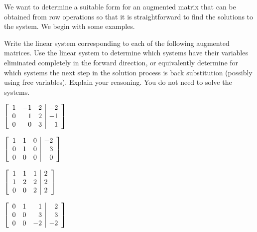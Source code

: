 \begin{pa} \label{pa:1_c}  We want to determine a suitable form for an augmented matrix that can be obtained from row operations so that it is straightforward to find the solutions to the system. We begin with some examples.

\be
\item Write the linear system corresponding to each of the following augmented matrices. Use the linear system to determine which systems have their variables eliminated completely in the forward direction, or equivalently determine for which systems the next step in the solution process is back substitution (possibly using free variables). Explain your reasoning. You do not need to solve the systems. 
	\begin{enumerate}[i.]
	\begin{minipage}{2.0in}
	\item $\displaystyle \left[ \begin{array}{rrc|r} 1 & -1 & 2 & -2 \\ 0 & 1 & 2& -1 \\ 0 & 0 & 3 & 1   \end{array} \right]$
	\end{minipage}
	\begin{minipage}{2.0in}
	\item $\displaystyle \left[ \begin{array}{crc|r} 1 & 1 & 0 & -2 \\ 0 & 1 & 0 & 3  \\ 0 & 0 & 0& 0 \end{array} \right]$
	\end{minipage}
	
	\begin{minipage}{2.0in}
	\item $\displaystyle \left[ \begin{array}{ccc|c} 1 & 1 & 1 & 2 \\ 1 & 2 & 2 & 2  \\ 0 & 0 & 2& 2 \end{array} \right]$
	\end{minipage}
	\begin{minipage}{2.0in}
	\item $\displaystyle \left[ \begin{array}{ccr|r} 0 & 1 & 1 & 2 \\ 0 & 0 & 3 & 3 \\ 0 & 0 & -2& -2 \end{array} \right]$
	\end{minipage}
	

\end{enumerate}
\end{pa}
